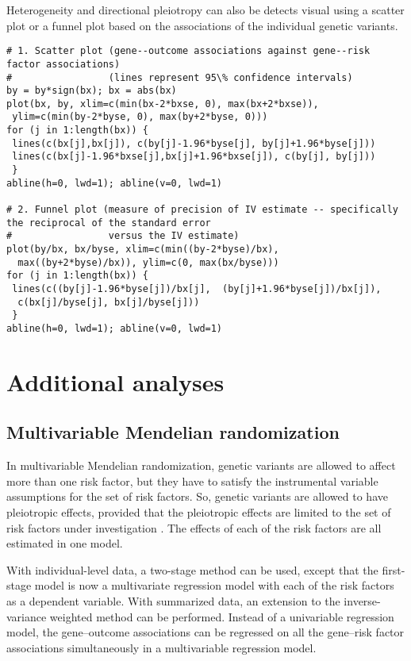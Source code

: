 \documentclass[a4paper,12pt]{article} %
\begin{document}
Heterogeneity and directional pleiotropy can also be detects visual using a scatter plot or a funnel plot based on the associations of the individual genetic variants.

\begin{lstlisting}
# 1. Scatter plot (gene--outcome associations against gene--risk factor associations)
#                 (lines represent 95\% confidence intervals)
by = by*sign(bx); bx = abs(bx)
plot(bx, by, xlim=c(min(bx-2*bxse, 0), max(bx+2*bxse)),
 ylim=c(min(by-2*byse, 0), max(by+2*byse, 0)))
for (j in 1:length(bx)) {
 lines(c(bx[j],bx[j]), c(by[j]-1.96*byse[j], by[j]+1.96*byse[j]))
 lines(c(bx[j]-1.96*bxse[j],bx[j]+1.96*bxse[j]), c(by[j], by[j]))
 }
abline(h=0, lwd=1); abline(v=0, lwd=1)

# 2. Funnel plot (measure of precision of IV estimate -- specifically the reciprocal of the standard error
#                 versus the IV estimate)
plot(by/bx, bx/byse, xlim=c(min((by-2*byse)/bx),
  max((by+2*byse)/bx)), ylim=c(0, max(bx/byse)))
for (j in 1:length(bx)) {
 lines(c((by[j]-1.96*byse[j])/bx[j],  (by[j]+1.96*byse[j])/bx[j]),
  c(bx[j]/byse[j], bx[j]/byse[j]))
 }
abline(h=0, lwd=1); abline(v=0, lwd=1)
\end{lstlisting}

\clearpage

\section{Additional analyses}
\subsection{Multivariable Mendelian randomization}
In multivariable Mendelian randomization, genetic variants are allowed to affect more than one risk factor, but they have to satisfy the instrumental variable assumptions for the set of risk factors. So, genetic variants are allowed to have pleiotropic effects, provided that the pleiotropic effects are limited to the set of risk factors under investigation \citep{burgess2014pleioaje}. The effects of each of the risk factors are all estimated in one model.

With individual-level data, a two-stage method can be used, except that the first-stage model is now a multivariate regression model with each of the risk factors as a dependent variable. With summarized data, an extension to the inverse-variance weighted method can be performed. Instead of a univariable regression model, the gene--outcome associations can be regressed on all the gene--risk factor associations simultaneously in a multivariable regression model.
\end{document}
